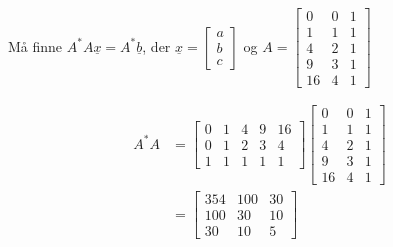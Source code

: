 \documentclass[11pt, a4paper, norsk]{NTNUoving}
\begin{document}
\begin{oppgave}
\begin{punkt}
           Må finne $A^{*}A\underline{x} = A^{*}\underline{b}$, der $\underline{x} = \begin{bmatrix}
               a \\
               b \\
               c
           \end{bmatrix}$ og $A = \begin{bmatrix}
           0 & 0 & 1 \\
           1 & 1 & 1 \\
           4 & 2 & 1 \\
           9 & 3 & 1 \\
           16 & 4 & 1
           \end{bmatrix}$

           \begin{align*}
               A^{*}A &= \begin{bmatrix}
                   0 & 1 & 4 & 9 & 16 \\
                   0 & 1 & 2 & 3 & 4 \\
                   1 & 1 & 1 & 1 & 1
               \end{bmatrix}\begin{bmatrix}
                   0 & 0 & 1 \\
                   1 & 1 & 1 \\
                   4 & 2 & 1 \\
                   9 & 3 & 1 \\
                   16 & 4 & 1
               \end{bmatrix}
               \\
                      &= \begin{bmatrix}
                          354 & 100 & 30 \\
                          100 & 30 & 10 \\
                          30 & 10 & 5
                      \end{bmatrix}
           \end{align*}
           

\end{punkt}
\end{oppgave}
\end{document}
